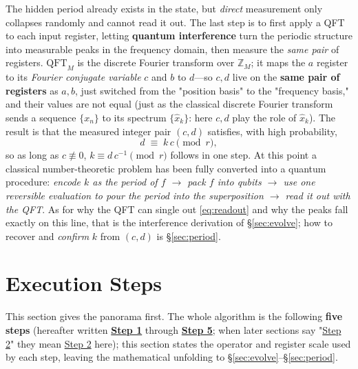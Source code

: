 \documentclass[11pt]{article}
\newcommand{\secref}[1]{\hyperref[#1]{\S\ref*{#1}}}
\begin{document}
The hidden period already exists in the state, but \emph{direct} measurement only collapses randomly and cannot read it out. The last step is to first apply a QFT to each input register, letting \textbf{quantum
interference} turn the periodic structure into measurable peaks in the frequency domain, then measure the \emph{same pair} of registers. $\mathrm{QFT}_M$ is the discrete Fourier
transform over $\mathbb{Z}_M$; it maps the $a$ register to its \emph{Fourier conjugate variable} $c$ and $b$ to $d$---so $c,d$ live on the \textbf{same pair of registers} as $a,b$,
just switched from the "position basis" to the "frequency basis," and their values are not equal (just as the classical discrete Fourier transform sends a sequence $\{x_n\}$ to its spectrum $\{\hat x_k\}$: here
$c,d$ play the role of $\hat x_k$). The result is that the measured integer pair $(c,d)$ satisfies, with high probability,
\begin{equation}
d\;\equiv\;k\,c\pmod r,
\label{eq:readout}
\end{equation}
so as long as $c\not\equiv0$, $k\equiv d\,c^{-1}\pmod r$ follows in one step. At this point a classical number-theoretic problem has been fully converted into a quantum procedure:
\emph{encode $k$ as the period of $f$ $\to$ pack $f$ into qubits $\to$ use one reversible evaluation to pour the period into the superposition $\to$ read it out with the QFT}.
As for why the QFT can single out \eqref{eq:readout} and why the peaks fall exactly on this line, that is the interference derivation of \secref{sec:evolve}; how to recover and \emph{confirm} $k$ from $(c,d)$
is \secref{sec:period}.

\section{Execution Steps}
\label{sec:steps}

This section gives the panorama first. The whole algorithm is the following \textbf{five steps} (hereafter written \textbf{\hyperref[step:prep]{Step 1}} through \textbf{\hyperref[step:recover]{Step 5}}; when later sections say "\hyperref[step:eval]{Step 2}"
they mean \hyperref[step:eval]{Step 2} here); this section states the operator and register scale used by each step, leaving the mathematical unfolding to \secref{sec:evolve}--\secref{sec:period}.
\end{document}
